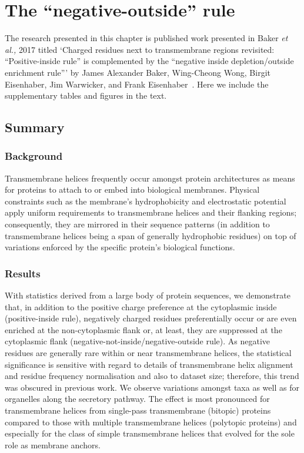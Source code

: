 \chapter{The ``negative-outside'' rule}
\sloppy

The research presented in this chapter is published work presented in Baker \textit{et al.,} 2017 titled `Charged residues next to transmembrane regions revisited: ``Positive\--inside rule'' is complemented by the ``negative inside depletion/outside enrichment rule''' by James Alexander Baker, Wing\--Cheong Wong, Birgit Eisenhaber, Jim Warwicker, and Frank Eisenhaber~\cite{Baker2017}.
Here we include the supplementary tables and figures in the text.

\section{Summary}

\subsection{Background}

Transmembrane helices frequently occur amongst protein architectures as means for proteins to attach to or embed into biological membranes.
Physical constraints such as the membrane’s hydrophobicity and electrostatic potential apply uniform requirements to transmembrane helices and their flanking regions; consequently, they are mirrored in their sequence patterns (in addition to transmembrane helices being a span of generally hydrophobic residues) on top of variations enforced by the specific protein’s biological functions.

\subsection{Results}

With statistics derived from a large body of protein sequences, we demonstrate that, in addition to the positive charge preference at the cytoplasmic inside (positive\--inside rule), negatively charged residues preferentially occur or are even enriched at the non\--cytoplasmic flank or, at least, they are suppressed at the cytoplasmic flank (negative\--not\--inside/negative\--outside rule).
As negative residues are generally rare within or near transmembrane helices, the statistical significance is sensitive with regard to details of transmembrane helix alignment and residue frequency normalisation and also to dataset size; therefore, this trend was obscured in previous work.
We observe variations amongst taxa as well as for organelles along the secretory pathway.
The effect is most pronounced for transmembrane helices from single-pass transmembrane (bitopic) proteins compared to those with multiple transmembrane helices (polytopic proteins) and especially for the class of simple transmembrane helices that evolved for the sole role as membrane anchors.


